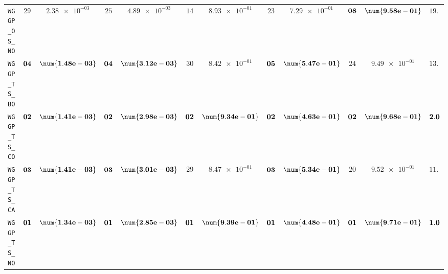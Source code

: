 \begin{table}[H]
\begin{tabularx}{\textwidth}{l||cC|cC|cC|cC|cC||c}
		\texttt{WGGP\_OS\_NO} & $ 29$ & $ \num{2.38e-03}$ & $ 25$ & $ \num{4.89e-03}$ & $ 14$ & $ \num{8.93e-01}$ & $ 23$ & $ \num{7.29e-01}$ & $\bf 08$ & $\bf \num{9.58e-01}$ & $ 19.8$  \\
		\texttt{WGGP\_TS\_BO} & $\bf 04$ & $\bf \num{1.48e-03}$ & $\bf 04$ & $\bf \num{3.12e-03}$ & $ 30$ & $ \num{8.42e-01}$ & $\bf 05$ & $\bf \num{5.47e-01}$ & $ 24$ & $ \num{9.49e-01}$ & $ 13.4$  \\
		\texttt{WGGP\_TS\_CO} & $\bf 02$ & $\bf \num{1.41e-03}$ & $\bf 02$ & $\bf \num{2.98e-03}$ & $\bf 02$ & $\bf \num{9.34e-01}$ & $\bf 02$ & $\bf \num{4.63e-01}$ & $\bf 02$ & $\bf \num{9.68e-01}$ & $\bf 2.0$  \\
		\texttt{WGGP\_TS\_CA} & $\bf 03$ & $\bf \num{1.41e-03}$ & $\bf 03$ & $\bf \num{3.01e-03}$ & $ 29$ & $ \num{8.47e-01}$ & $\bf 03$ & $\bf \num{5.34e-01}$ & $ 20$ & $ \num{9.52e-01}$ & $ 11.6$  \\
		\texttt{WGGP\_TS\_NO} & $\bf 01$ & $\bf \num{1.34e-03}$ & $\bf 01$ & $\bf \num{2.85e-03}$ & $\bf 01$ & $\bf \num{9.39e-01}$ & $\bf 01$ & $\bf \num{4.48e-01}$ & $\bf 01$ & $\bf \num{9.71e-01}$ & $\bf 1.0$  \\
	\end{tabularx}
\end{table}
